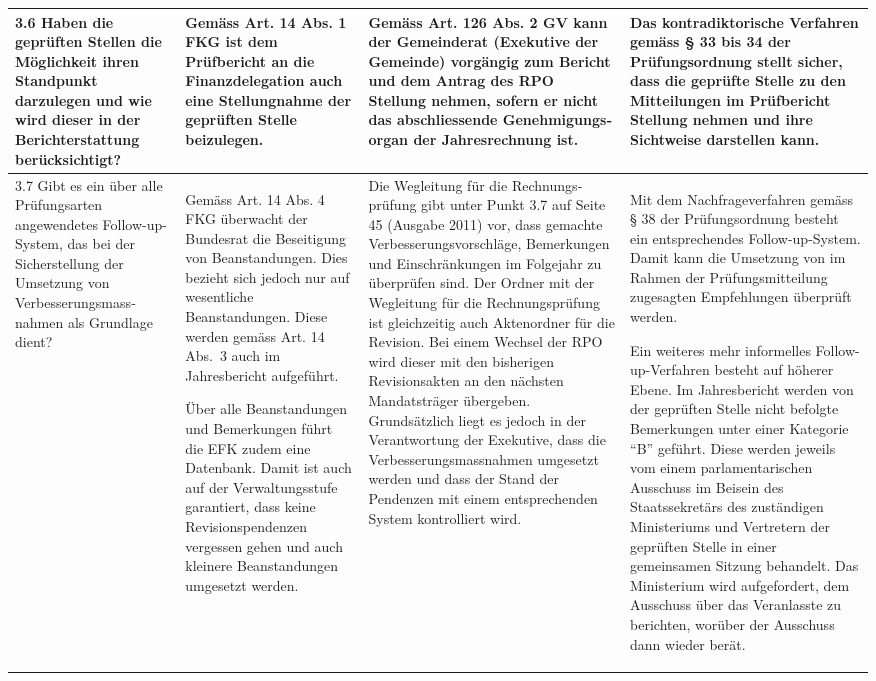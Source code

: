 \documentclass[10pt]{article}
\begin{document}
\begin{landscape}
\begin{center}
\begin{longtable}{|p{4cm}|p{5cm}|p{7.5cm}|p{7.5cm}|}
 \\
\hline
3.6 Haben die geprüften Stellen die Möglichkeit ihren Standpunkt darzulegen und wie wird dieser in der Berichterstattung berücksichtigt? & Gemäss Art. 14 Abs. 1 FKG ist dem Prüfbericht an die Finanz­delegation auch eine Stellung­nahme der geprüften Stelle beizulegen. & Gemäss Art. 126 Abs. 2 GV kann der Gemeinderat (Exekutive der Gemeinde) vorgängig zum Bericht und dem Antrag des RPO Stellung nehmen, sofern er nicht das abschliessende Genehmigungs­organ der Jahresrechnung ist. & Das kontradiktorische Verfahren gemäss § 33 bis 34 der Prüfungs­ordnung stellt sicher, dass die geprüfte Stelle zu den Mitteilungen im Prüfbericht Stellung nehmen und ihre Sichtweise darstellen kann. \\
\hline
3.7 Gibt es ein über alle Prüfungsarten angewendetes Follow-up-System, das bei der Sicherstellung der Umsetzung von Verbesserungsmass­nahmen als Grundlage dient? & Gemäss Art. 14 Abs. 4 FKG überwacht der Bundesrat die Beseitigung von Beanstandungen. Dies bezieht sich jedoch nur auf wesentliche Beanstandungen. Diese werden gemäss Art. 14 Abs.~3 auch im Jahresbericht aufgeführt. 

Über alle Beanstandungen und Bemerkungen führt die EFK zudem eine Datenbank. Damit ist auch auf der Verwaltungsstufe garantiert, dass keine Revisionspendenzen vergessen gehen und auch kleinere Beanstandungen umgesetzt werden.

\textit{~}

 & Die Wegleitung für die Rechnungs­prüfung gibt unter Punkt 3.7 auf Seite 45 (Ausgabe 2011) vor, dass gemachte Verbesserungsvor­schläge, Bemerkungen und Ein­schrän­kungen im Folgejahr zu überprüfen sind. Der Ordner mit der Wegleitung für die Rechnungs­prüfung ist gleichzeitig auch Akten­ordner für die Revision. Bei einem Wechsel der RPO wird dieser mit den bisherigen Revisionsakten an den nächsten Mandatsträger übergeben. Grundsätzlich liegt es jedoch in der Verantwortung der Exekutive, dass die Verbesse­rungsmassnahmen umgesetzt werden und dass der Stand der Pendenzen mit einem entspre­chenden System kontrolliert wird. & Mit dem Nachfrageverfahren gemäss § 38 der Prüfungs­ordnung besteht ein entsprechendes Follow-up-System. Damit kann die Umsetzung von im Rahmen der Prüfungsmitteilung zugesagten Empfehlungen überprüft werden.

Ein weiteres mehr informelles Follow-up-Verfahren besteht auf höherer Ebene. Im Jahresbericht werden von der geprüften Stelle nicht befolgte Bemerkungen unter einer Kategorie “{}B”{} geführt. Diese werden jeweils vom einem parlamentarischen Ausschuss im Beisein des Staatssekretärs des zuständigen Ministeriums und Vertretern der geprüften Stelle in einer gemeinsamen Sitzung behandelt. Das Ministerium wird aufgefordert, dem Ausschuss über das Veranlasste zu berichten, worüber der Ausschuss dann wieder berät.


\end{longtable}
\end{center}
\end{landscape}
\end{document}
